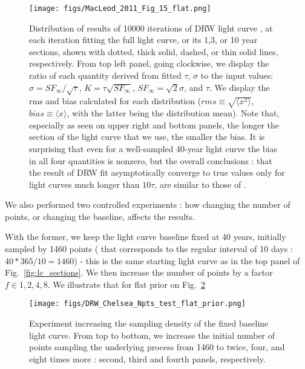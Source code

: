 \documentclass[fleqn,usenatbib]{mnras}  %
\begin{document}
\begin{figure}
\texttt{[image: figs/MacLeod\_2011\_Fig\_15\_flat.png]}
\caption{Distribution of results of 10000 iterations of DRW light curve , at each iteration fitting the full light curve, or its 1,3, or 10 year sections, shown with dotted, thick solid,  dashed, or thin solid lines, respectively. From top left panel, going clockwise, we display the ratio of each quantity derived from fitted $\tau$, $\sigma$ to the input values:  $\hat{\sigma}  = SF_{\infty}  / \sqrt{\tau}$,  $K = \tau \sqrt{SF_{\infty}}$, $SF_{\infty} = \sqrt{2} \sigma$, and $\tau$. We display the rms and bias calculated for each distribution ($rms \equiv  \sqrt{\langle x^{2}\rangle}$, $bias \equiv \langle x \rangle $, with the latter being the distribution mean). Note that, especially as seen on upper right and bottom panels, the longer the section of the light curve that we use, the smaller the bias. It is surprising that even for a well-sampled 40-year light curve the bias in all four quantities is nonzero, but the overall conclusions : that the result of DRW fit asymptotically converge to true values only for light curves much longer than $10 \tau$,  are similar to those of \citep{macleod2011}. }
\label{fig:macleod11_15}
\end{figure}



We also performed two controlled experiments : how changing the number of points, or changing the baseline, affects the results.  

With the former, we keep the light curve  baseline fixed at 40 years,  initially sampled by 1460 points ( that corresponds to the regular interval of 10 days : $40 * 365 / 10  = 1460$) - this is the same starting light curve as in the top panel of Fig.~\ref{fig:lc_sections}. 
We then increase the number of points by a factor $f \in {1,2,4,8}$. We illustrate that for flat prior on Fig.~\ref{fig:Npts_experiment}

\begin{figure}
\texttt{[image: figs/DRW\_Chelsea\_Npts\_test\_flat\_prior.png]}
\caption{Experiment increasing the sampling density of the fixed baseline light curve. From top to bottom, we increase the initial number of points sampling the underlying process from 1460 to twice, four, and eight times more : second, third and fourth panels, respectively. }
\label{fig:Npts_experiment}
\end{figure}
\end{document}
